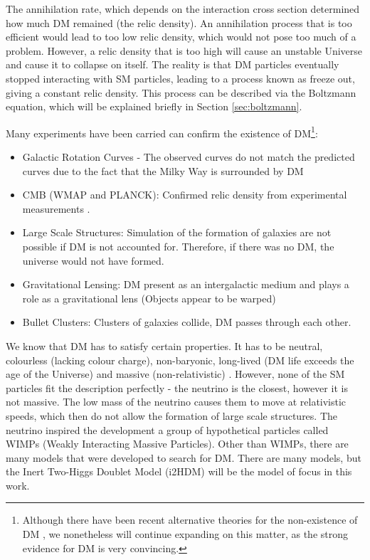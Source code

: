 \documentclass[12pt]{article}
\begin{document}
The annihilation rate, which depends on the interaction cross section determined how much DM remained (the relic density). An annihilation process that is too efficient would lead to too low relic density, which would not pose too much of a problem. However, a relic density that is too high will cause an unstable Universe and cause it to collapse on itself. The reality is that DM particles eventually stopped interacting with SM particles, leading to a process known as freeze out, giving a constant relic density. This process can be described via the Boltzmann equation, which will be explained briefly in Section \ref{sec:boltzmann}.

Many experiments have been carried can confirm the existence of DM\footnote{Although there have been recent alternative theories for the non-existence of DM \cite{Gupta_2023, Gupta_2024}, we nonetheless will continue expanding on this matter, as the strong evidence for DM is very convincing.}:

\begin{itemize}
    \item Galactic Rotation Curves - The observed curves do not match the predicted curves due to the fact that the Milky Way is surrounded by DM
    \item CMB (WMAP and PLANCK): Confirmed relic density from experimental measurements \cite{Planck:2018vyg}.
    \item Large Scale Structures: Simulation of the formation of galaxies are not possible if DM is not accounted for. Therefore, if there was no DM, the universe would not have formed.
    \item Gravitational Lensing: DM present as an intergalactic medium and plays a role as a gravitational lens (Objects appear to be warped)
    \item Bullet Clusters: Clusters of galaxies collide, DM passes through each other.
\end{itemize}

We know that DM has to satisfy certain properties. It has to be neutral, colourless (lacking colour charge), non-baryonic, long-lived (DM life exceeds the age of the Universe) and massive (non-relativistic) \cite{ZACEK_2007, DeLuca2018, gondolo2004introductionnonbaryonicdarkmatter}. However, none of the SM particles fit the description perfectly - the neutrino is the closest, however it is not massive. The low mass of the neutrino causes them to move at relativistic speeds, which then do not allow the formation of large scale structures. The neutrino inspired the development a group of hypothetical particles called WIMPs (Weakly Interacting Massive Particles). Other than WIMPs, there are many models that were developed to search for DM. There are many models, but the Inert Two-Higgs Doublet Model (i2HDM) will be the model of focus in this work. 
\end{document}
